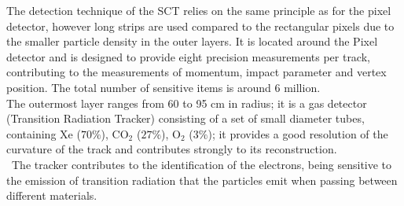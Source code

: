 The detection technique of the SCT relies on the same principle as for the pixel detector, however long strips are used compared to the rectangular pixels due to 
the smaller particle density in the outer layers.
It is located around the Pixel detector and is designed to provide eight precision measurements per track, contributing to the measurements of momentum, impact parameter and 
vertex position. The total number of sensitive items is around 6 million.
\vspace{\baselineskip}
\\The outermost layer ranges from 60 to 95 cm in radius; it is a gas detector (Transition Radiation Tracker) consisting of a set of small diameter tubes, containing $\mathrm{Xe}$ ($\mathrm{70\%}$), 
$\mathrm{CO_2}$ ($\mathrm{27\%}$),  $\mathrm{O_2}$ ($\mathrm{3\%}$); it provides a good resolution of the curvature of the track and contributes strongly to its reconstruction.\\\
The tracker contributes to the identification of the electrons, being sensitive to the emission of transition radiation that the particles emit when passing between different materials. 

